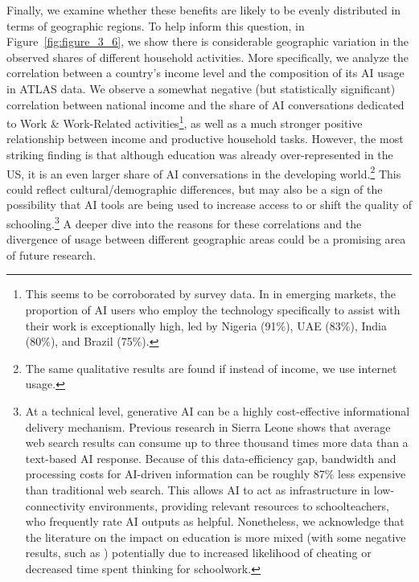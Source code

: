 \documentclass[11pt,a4paper]{article}
\begin{document}
Finally, we examine whether these benefits are likely to be evenly distributed in terms of geographic regions. To help inform this question, in Figure~\ref{fig:figure_3_6}, we show there is considerable geographic variation in the observed shares of different household activities. More specifically, we analyze the correlation between a country's income level and the composition of its AI usage in ATLAS data. We observe a somewhat negative (but statistically significant) correlation between national income and the share of AI conversations dedicated to Work \& Work-Related activities\footnote{This seems to be corroborated by survey data. In \cite{ipsos_google_2026_ai_survey} in emerging markets, the proportion of AI users who employ the technology specifically to assist with their work is exceptionally high, led by Nigeria (91\%), UAE (83\%), India (80\%), and Brazil (75\%).}, as well as a much stronger positive relationship between income and productive household tasks. However, the most striking finding is that although education was already over-represented in the US, it is an even larger share of AI conversations in the developing world.\footnote{The same qualitative results are found if instead of income, we use internet usage.} This could reflect cultural/demographic differences, but may also be a sign of the possibility that AI tools are being used to increase access to or shift the quality of schooling.\footnote{At a technical level, generative AI can be a highly cost-effective informational delivery mechanism. Previous research in Sierra Leone \citep{bjorkegren2025aileapfrogwebevidence} shows that average web search results can consume up to three thousand times more data than a text-based AI response. Because of this data-efficiency gap, bandwidth and processing costs for AI-driven information can be roughly 87\% less expensive than traditional web search. This allows AI to act as infrastructure in low-connectivity environments, providing relevant resources to schoolteachers, who frequently rate AI outputs as helpful. Nonetheless, we acknowledge that the literature on the impact on education is more mixed (with some negative results, such as \citet{Stromberg2026}) potentially due to increased likelihood of cheating or decreased time spent thinking for schoolwork.} A deeper dive into the reasons for these correlations and the divergence of usage between different geographic areas could be a promising area of future research.
\end{document}
